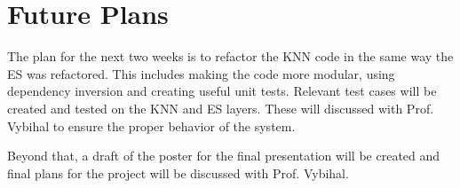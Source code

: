 \documentclass[]{article}
\begin{document}
	\section{Future Plans} \label{sec:plans}
		
	The plan for the next two weeks is to refactor the KNN code in the same way the ES was refactored. This includes making the code more modular, using dependency inversion and creating useful unit tests. Relevant test cases will be created and tested on the KNN and ES layers. These will discussed with Prof. Vybihal to ensure the proper behavior of the system.
	
	Beyond that, a draft of the poster for the final presentation will be created and final plans for the project will be discussed with Prof. Vybihal.
	
	
\end{document}
